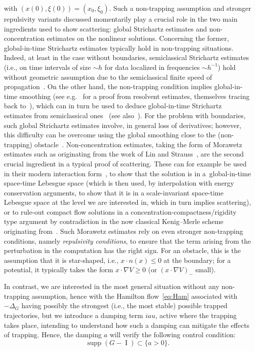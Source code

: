 \documentclass[AHL,Unicode,longabstracts,published]{cedram}
\DeclareMathOperator{\I}{I}
\DeclareMathOperator{\supp}{supp}
\begin{document}
with $(x(0), \xi(0)) = (x_0, \xi_0)$. Such a non-trapping assumption and stronger repulsivity variants discussed momentarily play a crucial role in the two main ingredients used to show scattering: global Strichartz estimates and non-concentration estimates on the nonlinear solutions. Concerning the former, global-in-time Strichartz estimates typically hold in non-trapping situations. Indeed, at least in the case without boundaries, semiclassical Strichartz estimates (i.e., on time intervals of size $\sim h$ for data localized in frequencies $\sim h^{-1}$) hold without geometric assumption due to the semiclassical finite speed of propagation~\cite{BuGeTz04}. On the other hand, the non-trapping condition implies global-in-time smoothing (see e.g.~\cite[Section~2.3]{BuGeTz04b} for a proof from resolvent estimates, themselves tracing back to~\cite{Bu02,LaPh89, MeSj82, Va89, VaZw00}), which can in turn be used to deduce global-in-time Strichartz estimates from semiclassical ones~\cite{Iv10, StTa02} (see also~\cite{BuGuHa10,Bu03}). For the problem with boundaries, such global Strichartz estimates involve, in general loss of derivatives; however, this difficulty can be overcome using the global smoothing close to the (non-trapping) obstacle~\cite{PV1, PV2}. Non-concentration estimates, taking the form of Morawetz estimates such as originating from the work of Lin and Strauss~\cite{LinStrauss}, are the second crucial ingredient in a typical proof of scattering. These can for example be used in their modern interaction form~\cite{CoKeStTaTa04,PV1}, to show that the solution is in a~global-in-time space-time Lebesgue space (which is then used, by interpolation with energy conservation arguments, to show that it is in a scale-invariant space-time Lebesgue space at the level we are interested in, which in turn implies scattering), or to rule-out compact flow solutions in a concentration-compactness/rigidity type argument by contradiction in the now classical Kenig--Merle scheme originating from~\cite{keMe06}. Such Morawetz estimates rely on even stronger non-trapping conditions, namely \emph{repulsivity conditions}, to ensure that the term arising from the perturbation in the computation has the right sign. For an obstacle, this is the assumption that it is star-shaped, i.e., $x\cdot n(x) \leq 0$ at the boundary; for a potential, it typically takes the form $x\cdot \nabla V \geq 0$ (or $(x\cdot \nabla V)_-$ small).


In contrast, we are interested in the most general situation without any non-trapping assumption, hence with the Hamilton flow~\eqref{eq:Ham} associated with $-\Delta_G$ having possibly the strongest (i.e., the most stable) possible trapped trajectories, but we introduce a damping term $iau$, active where the trapping takes place, intending to understand how such a damping can mitigate the effects of trapping. Hence, the damping $a$ will verify the following control condition:
\begin{equation}\label{eq:control}
\supp(G- \I) \subset \{ a>0 \}.
\end{equation}
\end{document}
